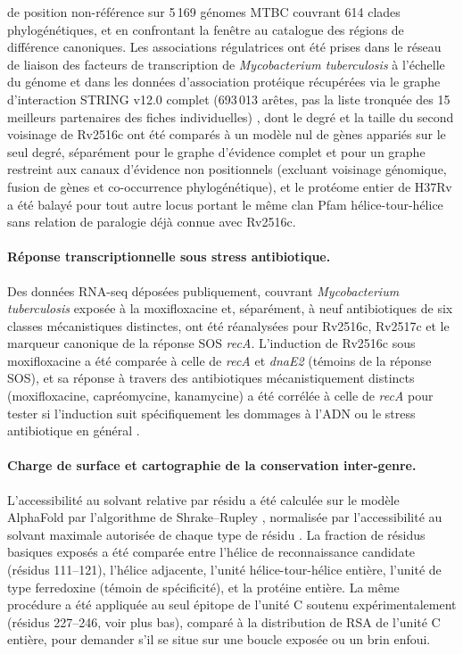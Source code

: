 \documentclass[11pt,a4paper]{article}
\newcommand{\mtb}{\textit{Mycobacterium tuberculosis}}
\begin{document}
de position non-référence sur 5\,169 génomes MTBC couvrant 614 clades phylogénétiques, et en
confrontant la fenêtre au catalogue des régions de différence canoniques. Les associations
régulatrices ont été prises dans le
réseau de liaison des facteurs de transcription de \mtb{} à l'échelle du génome
\citep{minch2015network} et dans les données d'association protéique récupérées via le graphe
d'interaction STRING v12.0 complet (693\,013 arêtes, pas la liste tronquée des 15 meilleurs
partenaires des fiches individuelles) \citep{szklarczyk2023string}, dont le degré et la taille du
second voisinage de Rv2516c ont été comparés à un modèle nul de gènes appariés sur le seul degré,
séparément pour le graphe d'évidence complet et pour un graphe restreint aux canaux d'évidence non
positionnels (excluant voisinage génomique, fusion de gènes et co-occurrence phylogénétique), et le
protéome entier de H37Rv a été balayé pour tout autre locus portant le même clan Pfam
hélice-tour-hélice sans relation de paralogie déjà connue avec Rv2516c.

\paragraph{Réponse transcriptionnelle sous stress antibiotique.} Des données RNA-seq déposées
publiquement, couvrant \mtb{} exposée à la moxifloxacine et, séparément, à neuf antibiotiques de
six classes mécanistiques distinctes, ont été réanalysées pour Rv2516c, Rv2517c et le marqueur
canonique de la réponse SOS \textit{recA}. L'induction de Rv2516c sous moxifloxacine a été comparée
à celle de \textit{recA} et \textit{dnaE2} (témoins de la réponse SOS), et sa réponse à travers des
antibiotiques mécanistiquement distincts (moxifloxacine, capréomycine, kanamycine) a été corrélée à
celle de \textit{recA} pour tester si l'induction suit spécifiquement les dommages à l'ADN ou le
stress antibiotique en général \citep{iacobino2021moxifloxacin}.

\paragraph{Charge de surface et cartographie de la conservation inter-genre.} L'accessibilité au
solvant relative par résidu a été calculée sur le modèle AlphaFold par l'algorithme de
Shrake--Rupley \citep{shrake1973sasa}, normalisée par l'accessibilité au solvant maximale autorisée
de chaque type de résidu \citep{tien2013maxasa}. La fraction de résidus basiques exposés a été
comparée entre l'hélice de reconnaissance candidate (résidus 111--121), l'hélice adjacente, l'unité
hélice-tour-hélice entière, l'unité de type ferredoxine (témoin de spécificité), et la protéine
entière. La même procédure a été appliquée au seul épitope de l'unité C soutenu
expérimentalement (résidus 227--246, voir plus bas), comparé à la distribution de RSA de l'unité C
entière, pour demander s'il se situe sur une boucle exposée ou un brin enfoui.
\end{document}
